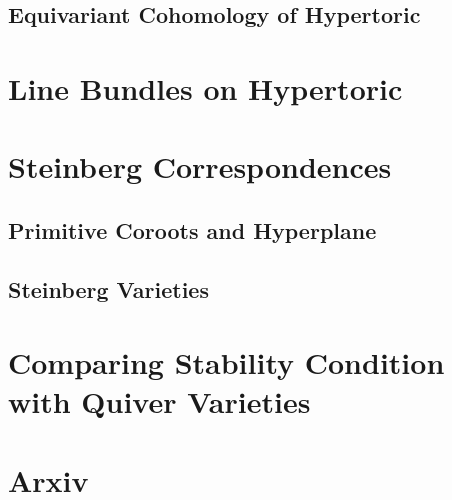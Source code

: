 \documentclass[b5paper]{article}
\begin{document}
\subsection{Equivariant Cohomology of Hypertoric}
\section{Line Bundles on Hypertoric}
\section{Steinberg Correspondences}
\subsection{Primitive Coroots and Hyperplane}
\subsection{Steinberg Varieties}

\section{Comparing Stability Condition with Quiver Varieties}
\label{sec:quiver_variety}
\section{Arxiv}
\end{document}
